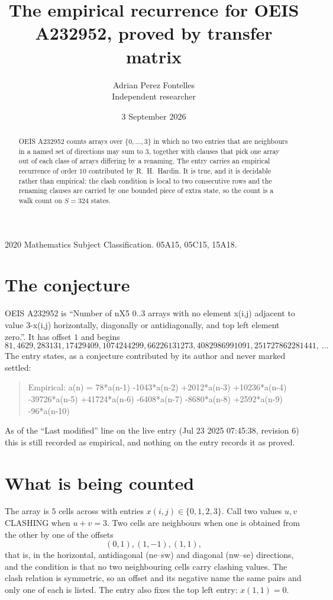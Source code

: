 \documentclass[11pt,a4paper]{article}
\title{The empirical recurrence for OEIS A232952, proved by transfer matrix}
\author{Adrian Perez Fontelles\\ \small Independent researcher}
\date{3 September 2026}
\theoremstyle{plain}
\theoremstyle{definition}
\begin{document}
\maketitle

\begin{abstract}
OEIS A232952 counts arrays over $\{0,\dots,3\}$ in which no two entries that are neighbours in
a named set of directions may sum to $3$, together with clauses that pick one array out of
each class of arrays differing by a renaming. The entry carries an empirical recurrence of
order $10$ contributed by R.~H.~Hardin. It is true, and it is decidable rather than
empirical: the clash condition is local to two consecutive rows and the renaming clauses are
carried by one bounded piece of extra state, so the count is a walk count on $S=324$ states.
\end{abstract}

\noindent\small 2020 Mathematics Subject Classification. 05A15, 05C15, 15A18.\normalsize

\section{The conjecture}

OEIS A232952 is ``Number of nX5 0..3 arrays with no element x(i,j) adjacent to value 3-x(i,j) horizontally, diagonally or antidiagonally, and top left element zero.''. It has offset $1$ and begins
\[
81, 4629, 283131, 17429409, 1074244299, 66226131273, 4082986991091, 251727862281441,\ \dots
\]
The entry states, as a conjecture contributed by its author and never marked settled:
\begin{quote}
Empirical: a(n) = 78*a(n-1) -1043*a(n-2) +2012*a(n-3) +10236*a(n-4) -39726*a(n-5) +41724*a(n-6) -6408*a(n-7) -8680*a(n-8) +2592*a(n-9) -96*a(n-10)
\end{quote}
As of the ``Last modified'' line on the live entry (Jul 23 2025 07:45:38, revision 6) this is still
recorded as empirical, and nothing on the entry records it as proved.

\section{What is being counted}

The array is $5$ cells across with entries $x(i,j)\in\{0,1,2,3\}$. Call two values $u,v$ CLASHING
when $u+v=3$. Two cells are neighbours when one is obtained from the other by one of
the offsets
\[
(0,1), (1,-1), (1,1),
\]
that is, in the horizontal, antidiagonal (ne--sw) and diagonal (nw--se) directions, and the condition is that no two neighbouring cells carry
clashing values. The clash relation is symmetric, so an offset and its negative name the
same pairs and only one of each is listed. The entry also fixes the top left entry: $x(1,1)=0$.
\end{document}

